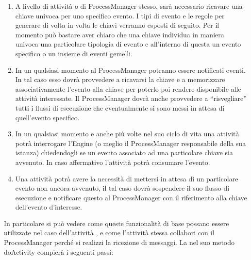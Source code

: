 \begin{enumerate}
  \item A livello di attività o di ProcessManager stesso,
  sarà necessario ricavare una chiave univoca per uno specifico 
  evento. I tipi di evento e le regole per generare di volta in
  volta le chiavi verranno esposti di seguito. Per il momento può bastare aver
  chiaro che una chiave individua in maniera univoca una particolare tipologia di evento e all'interno di questa un evento specifico o un insieme
  di eventi gemelli.
  
  \item In un qualsiasi momento al ProcessManager potranno essere notificati
  eventi. In tal caso esso dovrà provvedere a ricavarsi la chiave e a
  memorizzare associativamente l'evento alla chiave per poterlo poi rendere
  disponibile alle attività interessate. Il ProcessManager dovrà anche
  provvedere a ``risvegliare'' tutti i flussi di esecuzione che
  eventualmente si sono messi in attesa di quell'evento specifico.
   
  \item In un qualsiasi momento e anche più volte nel suo ciclo di vita una
  attività potrà interrogare l'Engine (o meglio il ProcessManager responsabile
  della sua istanza) chiedendogli se un evento associato ad una particolare
  chiave sia avvenuto. In caso affermativo l'attività potrà consumare l'evento.

  \item Una attività potrà avere la necessità di mettersi in attesa di un
  particolare evento non ancora avvenuto, il tal caso dovrà sospendere il
  suo flusso di esecuzione e notificare questo al ProcessManager
  con il riferimento alla chiave dell'evento d'interesse. 
\end{enumerate}


In particolare si può vedere come queste funzionalità di base possano essere
utilizzate nel caso dell'attività , e come
l'attività stessa collabori con il ProcessManager perché si realizzi la
ricezione di messaggi. La  nel suo metodo doActivity
compierà i seguenti passi:

